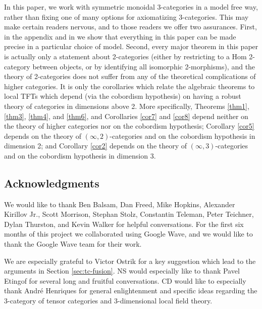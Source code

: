 \documentclass{amsart}
\begin{document}
In this paper, we work with symmetric monoidal 3-categories in a model free way, rather than fixing one of many options for axiomatizing 3-categories.  This may make certain readers nervous, and to those readers we offer two assurances.  First, in the appendix and in \cite{3TC} we show that everything in this paper can be made precise in a particular choice of model.  Second, every major theorem in this paper is actually only a statement about 2-categories (either by restricting to a Hom 2-category between objects, or by identifying all isomorphic 2-morphisms), and the theory of 2-categories does not suffer from any of the theoretical complications of higher categories.  It is only the corollaries which relate the algebraic theorems to local TFTs which depend (via the cobordism hypothesis) on having a robust theory of categories in dimensions above 2.  More specifically, Theorems \ref{thm1}, \ref{thm3}, \ref{thm4}, and \ref{thm6}, and Corollaries \ref{cor7} and \ref{cor8} depend neither
on the theory of higher categories nor on the cobordism hypothesis;
Corollary \ref{cor5} depends on the theory of $(\infty,2)$-categories and on the
cobordism hypothesis in dimension 2; and Corollary \ref{cor2} depends on the theory
of $(\infty,3)$-categories and on the cobordism hypothesis in dimension
3.

\subsection*{Acknowledgments}

We would like to thank Ben Balsam, Dan Freed, Mike Hopkins, Alexander Kirillov Jr., Scott Morrison, Stephan Stolz, Constantin Teleman, Peter Teichner, Dylan Thurston, and Kevin Walker for helpful conversations.   For the first six months of this project we collaborated using Google Wave, and we would like to thank the Google Wave team for their work.  

We are especially grateful to Victor Ostrik for a key suggestion which lead to the arguments in Section \ref{sec:tc-fusion}.
NS would especially like to thank Pavel Etingof for several long and fruitful conversations.  CD would like to especially thank Andr\'e Henriques for general enlightenment and specific ideas regarding the 3-category of tensor categories and 3-dimensional local field theory.
\end{document}
